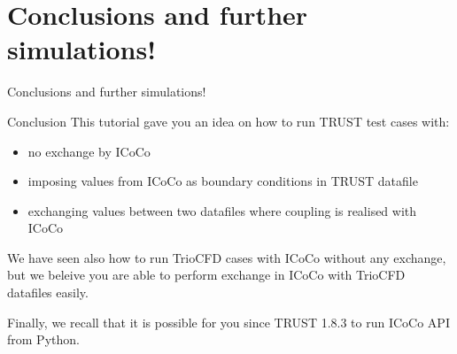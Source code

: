 \documentclass[10pt, hyperref={unicode=true,pdfusetitle, bookmarks=true,bookmarksnumbered=false,bookmarksopen=false, breaklinks=false,pdfborder={0 0 1},backref=true,colorlinks=true,linkcolor=darkblue,pageanchor, urlcolor=darkblue}]{beamer}
\begin{document}
\section{{\bf{Conclusions and further simulations!}}}
\begin{frame}
\end{frame}
\begin{frame}{Conclusions and further simulations!}

\begin{block}{Conclusion}
This tutorial gave you an idea on how to run TRUST test cases with:
\begin{itemize}
\item no exchange by ICoCo
\item imposing values from ICoCo as boundary conditions in TRUST datafile
\item exchanging values between two datafiles where coupling is realised with ICoCo
\end{itemize}
\end{block}

\begin{block}{}
We have seen also how to run TrioCFD cases with ICoCo without any exchange, but we beleive you are able to perform exchange in ICoCo with TrioCFD datafiles easily.
\end{block}

\begin{block}{}
Finally, we recall that it is possible for you since TRUST 1.8.3 to run ICoCo API from Python.
\end{block}
\end{frame}






\end{document}
